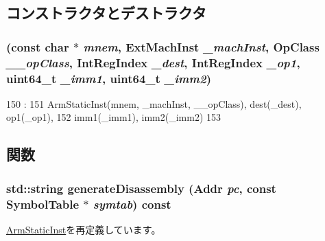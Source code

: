 \subsection{コンストラクタとデストラクタ}
\hypertarget{classArmISA_1_1DataX1Reg2ImmOp_a26f0bef26b3a9145885c59adc66c39dc}{
\subsubsection[{DataX1Reg2ImmOp}]{ (const char $\ast$ {\em mnem}, \/  {\bf ExtMachInst} {\em \_\-machInst}, \/  OpClass {\em \_\-\_\-opClass}, \/  {\bf IntRegIndex} {\em \_\-dest}, \/  {\bf IntRegIndex} {\em \_\-op1}, \/  uint64\_\-t {\em \_\-imm1}, \/  uint64\_\-t {\em \_\-imm2})}}
\label{classArmISA_1_1DataX1Reg2ImmOp_a26f0bef26b3a9145885c59adc66c39dc}



\begin{DoxyCode}
150                                     :
151         ArmStaticInst(mnem, _machInst, __opClass), dest(_dest), op1(_op1),
152         imm1(_imm1), imm2(_imm2)
153     {}

\end{DoxyCode}


\subsection{関数}
\hypertarget{classArmISA_1_1DataX1Reg2ImmOp_a95d323a22a5f07e14d6b4c9385a91896}{
\subsubsection[{generateDisassembly}]{\setlength{\rightskip}{0pt plus 5cm}std::string generateDisassembly ({\bf Addr} {\em pc}, \/  const SymbolTable $\ast$ {\em symtab}) const}}
\label{classArmISA_1_1DataX1Reg2ImmOp_a95d323a22a5f07e14d6b4c9385a91896}


\hyperlink{classArmISA_1_1ArmStaticInst_a95d323a22a5f07e14d6b4c9385a91896}{ArmStaticInst}を再定義しています。


